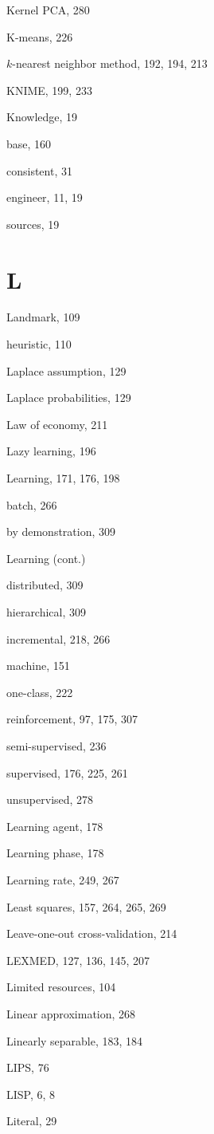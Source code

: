 \documentclass[10pt]{book}
\begin{document}
\begin{center}
Kernel PCA, 280

K-means, 226

$k$-nearest neighbor method, 192, 194, 213

KNIME, 199, 233

Knowledge, 19

base, 160

consistent, 31

engineer, 11, 19

sources, 19

\section{L}

Landmark, 109

heuristic, 110

Laplace assumption, 129

Laplace probabilities, 129

Law of economy, 211

Lazy learning, 196

Learning, 171, 176, 198

batch, 266

by demonstration, 309

Learning (cont.)

distributed, 309

hierarchical, 309

incremental, 218, 266

machine, 151

one-class, 222

reinforcement, 97, 175, 307

semi-supervised, 236

supervised, 176, 225, 261

unsupervised, 278

Learning agent, 178

Learning phase, 178

Learning rate, 249, 267

Least squares, 157, 264, 265, 269

Leave-one-out cross-validation, 214

LEXMED, 127, 136, 145, 207

Limited resources, 104

Linear approximation, 268

Linearly separable, 183, 184

LIPS, 76

LISP, 6, 8

Literal, 29


\end{center}
\end{document}
